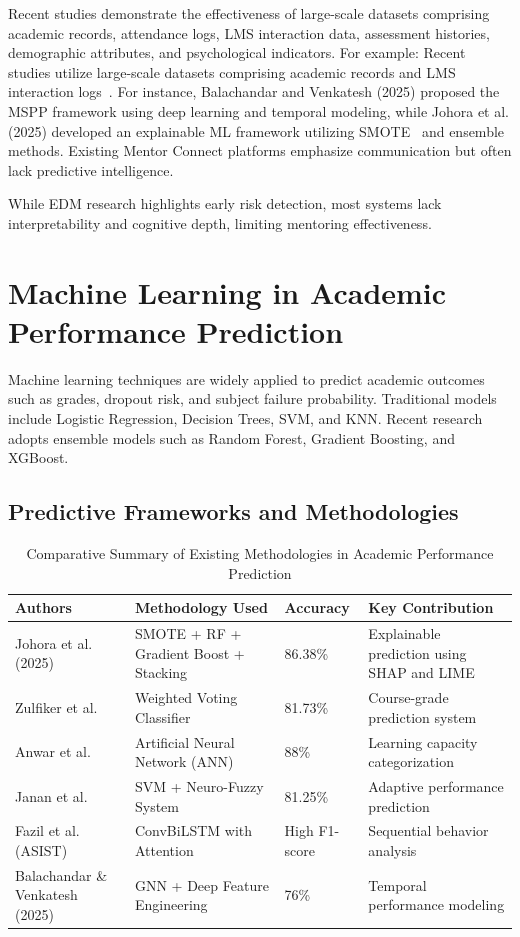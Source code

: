 \documentclass[12pt,a4paper]{report}
\begin{document}
Recent studies demonstrate the effectiveness of large-scale datasets comprising academic records, attendance logs, LMS interaction data, assessment histories, demographic attributes, and psychological indicators. For example:
Recent studies utilize large-scale datasets comprising academic records and LMS interaction logs~\cite{alavala2025edm}. For instance, Balachandar and Venkatesh (2025) proposed the MSPP framework using deep learning and temporal modeling, while Johora et al. (2025) developed an explainable ML framework utilizing SMOTE~\cite{chawla2002smote} and ensemble methods. Existing Mentor Connect platforms emphasize communication but often lack predictive intelligence.

While EDM research highlights early risk detection, most systems lack interpretability and cognitive depth, limiting mentoring effectiveness.


\section{Machine Learning in Academic Performance Prediction}

Machine learning techniques are widely applied to predict academic outcomes such as grades, dropout risk, and subject failure probability. Traditional models include Logistic Regression, Decision Trees, SVM, and KNN. Recent research adopts ensemble models such as Random Forest, Gradient Boosting, and XGBoost.

\subsection{Predictive Frameworks and Methodologies}

\begin{table}[H]
\centering
\caption{Comparative Summary of Existing Methodologies in Academic Performance Prediction}
\label{tab:ml_comparison}
\begin{tabular}{|p{3.5cm}|p{4.5cm}|p{2cm}|p{4cm}|}
\hline
\textbf{Authors} & \textbf{Methodology Used} & \textbf{Accuracy} & \textbf{Key Contribution} \\
\hline
Johora et al. (2025) & SMOTE + RF + Gradient Boost + Stacking & 86.38\% & Explainable prediction using SHAP and LIME \\
\hline
Zulfiker et al. & Weighted Voting Classifier & 81.73\% & Course-grade prediction system \\
\hline
Anwar et al. & Artificial Neural Network (ANN) & 88\% & Learning capacity categorization \\
\hline
Janan et al. & SVM + Neuro-Fuzzy System & 81.25\% & Adaptive performance prediction \\
\hline
Fazil et al. (ASIST) & ConvBiLSTM with Attention & High F1-score & Sequential behavior analysis \\
\hline
Balachandar \& Venkatesh (2025) & GNN + Deep Feature Engineering & 76\% & Temporal performance modeling \\
\hline
\end{tabular}
\end{table}
\end{document}
